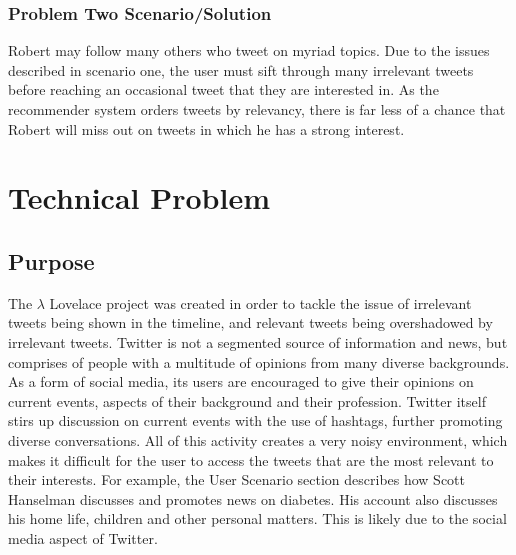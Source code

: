 \documentclass{article}
\begin{document}
\subsubsection*{Problem Two Scenario/Solution} 
Robert may follow many others who tweet on myriad topics. Due to the issues described in scenario one, the user must sift through many irrelevant tweets before reaching an occasional tweet that they are interested in. As the recommender system orders tweets by relevancy, there is far less of a chance that Robert will miss out on tweets in which he has a strong interest.


\newpage





































\section{Technical Problem} 

\subsection{Purpose} 
The $\lambda$ Lovelace project was created in order to tackle the issue of irrelevant tweets being shown in the timeline, and relevant tweets being overshadowed by irrelevant tweets. Twitter is not a segmented source of information and news, but comprises of people with a multitude of opinions from many diverse backgrounds. As a form of social media, its users are encouraged to give their opinions on current events, aspects of their background and their profession. Twitter itself stirs up discussion on current events with the use of hashtags, further promoting diverse conversations. All of this activity creates a very noisy environment, which makes it difficult for the user to access the tweets that are the most relevant to their interests. For example, the User Scenario section describes how Scott Hanselman discusses and promotes news on diabetes. His account also discusses his home life, children and other personal matters. This is likely due to the social media aspect of Twitter. 
\end{document}
